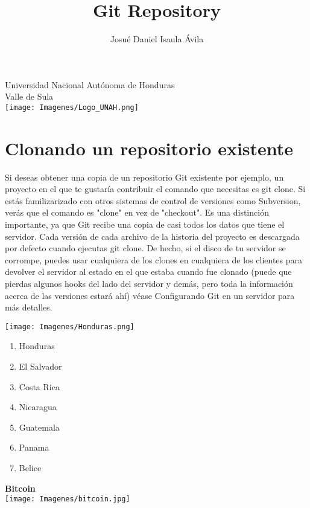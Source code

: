 \documentclass[12pt,a4paper]{article}
\author{Josué Daniel Isaula Ávila}
\title{Git Repository}
\begin{document}
\maketitle 

\begin{center}
    \huge Universidad Nacional Autónoma de Honduras \\ 
    \large Valle de Sula \\
    \vspace{5 mm}
    \texttt{[image: Imagenes/Logo\_UNAH.png]}
\end{center}
\newpage

\section{Clonando un repositorio existente}
Si deseas obtener una copia de un repositorio Git existente por ejemplo, un
proyecto en el que te gustaría contribuir el comando que necesitas es git clone. Si
estás familizarizado con otros sistemas de control de versiones como Subversion, verás
que el comando es "clone" en vez de "checkout". Es una distinción importante, ya que
Git recibe una copia de casi todos los datos que tiene el servidor. Cada versión de
cada archivo de la historia del proyecto es descargada por defecto cuando ejecutas git
clone. De hecho, si el disco de tu servidor se corrompe, puedes usar cualquiera de los
clones en cualquiera de los clientes para devolver el servidor al estado en el que
estaba cuando fue clonado (puede que pierdas algunos hooks del lado del servidor y
demás, pero toda la información acerca de las versiones estará ahí) véase
Configurando Git en un servidor para más detalles. \vspace{0.5 cm}

\centering 
\texttt{[image: Imagenes/Honduras.png]}

\newpage 
\begin{enumerate}
    \item Honduras 
    \item El Salvador 
    \item Costa Rica 
    \item Nicaragua
    \item Guatemala
    \item Panama
    \item Belice 
\end{enumerate}

\Huge{\bf Bitcoin} \\
\vspace{0.5 cm}
\centering
\texttt{[image: Imagenes/bitcoin.jpg]}
\end{document}
